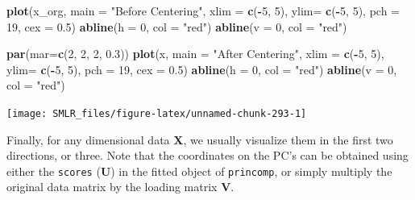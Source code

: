 \documentclass[
]{book}
\newenvironment{Shaded}{\begin{snugshade}}{\end{snugshade}}
\newcommand{\AttributeTok}[1]{\textcolor[rgb]{0.13,0.29,0.53}{#1}}
\newcommand{\DecValTok}[1]{\textcolor[rgb]{0.00,0.00,0.81}{#1}}
\newcommand{\FloatTok}[1]{\textcolor[rgb]{0.00,0.00,0.81}{#1}}
\newcommand{\FunctionTok}[1]{\textcolor[rgb]{0.13,0.29,0.53}{\textbf{#1}}}
\newcommand{\NormalTok}[1]{#1}
\newcommand{\SpecialCharTok}[1]{\textcolor[rgb]{0.81,0.36,0.00}{\textbf{#1}}}
\newcommand{\StringTok}[1]{\textcolor[rgb]{0.31,0.60,0.02}{#1}}
\theoremstyle{definition}
\theoremstyle{definition}
\theoremstyle{definition}
\theoremstyle{definition}
\theoremstyle{remark}
\begin{document}
\begin{Shaded}
\begin{Highlighting}[]
    \FunctionTok{plot}\NormalTok{(x\_org, }\AttributeTok{main =} \StringTok{"Before Centering"}\NormalTok{, }
         \AttributeTok{xlim =} \FunctionTok{c}\NormalTok{(}\SpecialCharTok{{-}}\DecValTok{5}\NormalTok{, }\DecValTok{5}\NormalTok{), }\AttributeTok{ylim=} \FunctionTok{c}\NormalTok{(}\SpecialCharTok{{-}}\DecValTok{5}\NormalTok{, }\DecValTok{5}\NormalTok{), }\AttributeTok{pch =} \DecValTok{19}\NormalTok{, }\AttributeTok{cex =} \FloatTok{0.5}\NormalTok{)}
    \FunctionTok{abline}\NormalTok{(}\AttributeTok{h =} \DecValTok{0}\NormalTok{, }\AttributeTok{col =} \StringTok{"red"}\NormalTok{)}
    \FunctionTok{abline}\NormalTok{(}\AttributeTok{v =} \DecValTok{0}\NormalTok{, }\AttributeTok{col =} \StringTok{"red"}\NormalTok{)}
    
    \FunctionTok{par}\NormalTok{(}\AttributeTok{mar=}\FunctionTok{c}\NormalTok{(}\DecValTok{2}\NormalTok{, }\DecValTok{2}\NormalTok{, }\DecValTok{2}\NormalTok{, }\FloatTok{0.3}\NormalTok{))}
    \FunctionTok{plot}\NormalTok{(x, }\AttributeTok{main =} \StringTok{"After Centering"}\NormalTok{, }
         \AttributeTok{xlim =} \FunctionTok{c}\NormalTok{(}\SpecialCharTok{{-}}\DecValTok{5}\NormalTok{, }\DecValTok{5}\NormalTok{), }\AttributeTok{ylim=} \FunctionTok{c}\NormalTok{(}\SpecialCharTok{{-}}\DecValTok{5}\NormalTok{, }\DecValTok{5}\NormalTok{), }\AttributeTok{pch =} \DecValTok{19}\NormalTok{, }\AttributeTok{cex =} \FloatTok{0.5}\NormalTok{)}
    \FunctionTok{abline}\NormalTok{(}\AttributeTok{h =} \DecValTok{0}\NormalTok{, }\AttributeTok{col =} \StringTok{"red"}\NormalTok{)}
    \FunctionTok{abline}\NormalTok{(}\AttributeTok{v =} \DecValTok{0}\NormalTok{, }\AttributeTok{col =} \StringTok{"red"}\NormalTok{)    }
\end{Highlighting}
\end{Shaded}

\begin{center}\texttt{[image: SMLR\_files/figure-latex/unnamed-chunk-293-1]} \end{center}

Finally, for any dimensional data \(\mathbf{X}\), we usually visualize them in the first two directions, or three. Note that the coordinates on the PC's can be obtained using either the \texttt{scores} (\(\mathbf{U}\)) in the fitted object of \texttt{princomp}, or simply multiply the original data matrix by the loading matrix \(\mathbf{V}\).
\end{document}
